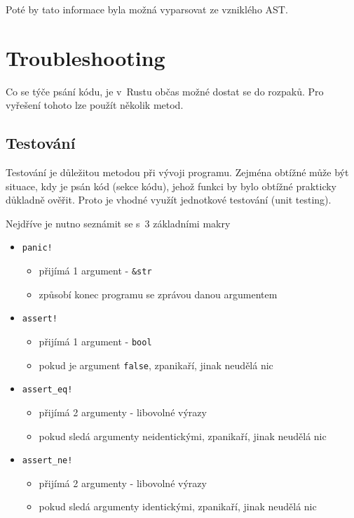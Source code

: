 \documentclass[a4paper, 12pt, twoside]{article} %
\newcommand{\rust}[1]{\texttt{#1}}
\begin{document}
			Poté by tato informace byla možná vyparsovat ze vzniklého AST.\cite{atrib_makro}


\section{Troubleshooting}
	Co se týče psání kódu, je v~Rustu občas možné dostat se do rozpaků. Pro vyřešení tohoto lze použít několik metod.


	\subsection{Testování}
		Testování je důležitou metodou při vývoji programu. Zejména obtížné může být situace, kdy je psán kód (sekce kódu), jehož funkci by bylo obtížné prakticky důkladně ověřit. Proto je vhodné využít jednotkové testování (unit testing).
		
		Nejdříve je nutno seznámit se s~3 základními makry
		\begin{itemize}
			\item \rust{panic!}
				\begin{itemize}
					\item přijímá 1 argument - \rust{&str}
					\item způsobí konec programu se zprávou danou argumentem
				\end{itemize} 
			\item \rust{assert!}
				\begin{itemize}
					\item přijímá 1 argument - \rust{bool}
					\item pokud je argument \rust{false}, zpanikaří, jinak neudělá nic
				\end{itemize}
			\item \rust{assert_eq!}
				\begin{itemize}
					\item přijímá 2 argumenty - libovolné výrazy
					\item pokud sledá argumenty neidentickými, zpanikaří, jinak neudělá nic
				\end{itemize}
			\item \rust{assert_ne!}
				\begin{itemize}
					\item přijímá 2 argumenty - libovolné výrazy
					\item pokud sledá argumenty identickými, zpanikaří, jinak neudělá nic
				\end{itemize}
		\end{itemize}
\end{document}
